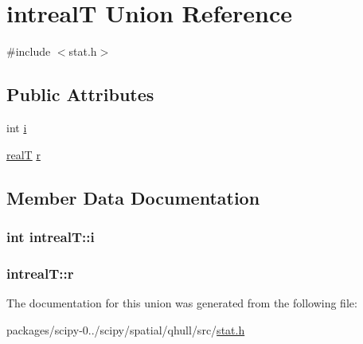 \hypertarget{unionintrealT}{}\section{intreal\+T Union Reference}
\label{unionintrealT}


{\ttfamily \#include $<$stat.\+h$>$}

\subsection*{Public Attributes}
\begin{DoxyCompactItemize}
\item 
int \hyperlink{unionintrealT_aa0a89e9d2c91ba5cdfab510a979a7dfc}{i}
\item 
\hyperlink{user_8h_ad6fe71dff955732ea8682263e9540bb7}{real\+T} \hyperlink{unionintrealT_a0fb3f881c81cb9719edd5117774107bf}{r}
\end{DoxyCompactItemize}


\subsection{Member Data Documentation}
\hypertarget{unionintrealT_aa0a89e9d2c91ba5cdfab510a979a7dfc}{}
\subsubsection[{i}]{\setlength{\rightskip}{0pt plus 5cm}int intreal\+T\+::i}\label{unionintrealT_aa0a89e9d2c91ba5cdfab510a979a7dfc}
\hypertarget{unionintrealT_a0fb3f881c81cb9719edd5117774107bf}{}
\subsubsection[{r}]{ intreal\+T\+::r}\label{unionintrealT_a0fb3f881c81cb9719edd5117774107bf}


The documentation for this union was generated from the following file\+:\begin{DoxyCompactItemize}
\item 
packages/scipy-\/0../scipy/spatial/qhull/src/\hyperlink{spatial_2qhull_2src_2stat_8h}{stat.\+h}\end{DoxyCompactItemize}
